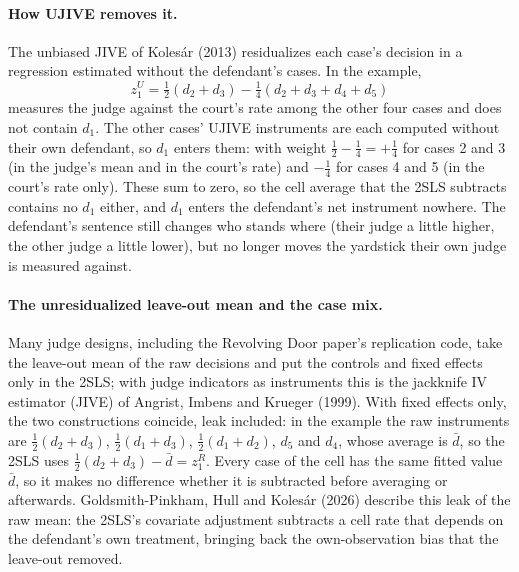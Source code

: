 \documentclass[11pt]{article}
\begin{document}
\paragraph{How UJIVE removes it.} The unbiased JIVE of Kolesár (2013) residualizes each case's decision in a regression estimated without the defendant's cases. In the example,
\begin{equation*}
z^U_1 = \tfrac12(d_2 + d_3) - \tfrac14(d_2 + d_3 + d_4 + d_5)
\end{equation*}
measures the judge against the court's rate among the other four cases and does not contain $d_1$. The other cases' UJIVE instruments are each computed without their own defendant, so $d_1$ enters them: with weight $\tfrac12 - \tfrac14 = +\tfrac14$ for cases 2 and 3 (in the judge's mean and in the court's rate) and $-\tfrac14$ for cases 4 and 5 (in the court's rate only). These sum to zero, so the cell average that the 2SLS subtracts contains no $d_1$ either, and $d_1$ enters the defendant's net instrument nowhere. The defendant's sentence still changes who stands where (their judge a little higher, the other judge a little lower), but no longer moves the yardstick their own judge is measured against.

\paragraph{The unresidualized leave-out mean and the case mix.} Many judge designs, including the Revolving Door paper's replication code, take the leave-out mean of the raw decisions and put the controls and fixed effects only in the 2SLS; with judge indicators as instruments this is the jackknife IV estimator (JIVE) of Angrist, Imbens and Krueger (1999). With fixed effects only, the two constructions coincide, leak included: in the example the raw instruments are $\tfrac12(d_2+d_3)$, $\tfrac12(d_1+d_3)$, $\tfrac12(d_1+d_2)$, $d_5$ and $d_4$, whose average is $\bar d$, so the 2SLS uses $\tfrac12(d_2+d_3) - \bar d = z^R_1$. Every case of the cell has the same fitted value $\bar d$, so it makes no difference whether it is subtracted before averaging or afterwards. Goldsmith-Pinkham, Hull and Kolesár (2026) describe this leak of the raw mean: the 2SLS's covariate adjustment subtracts a cell rate that depends on the defendant's own treatment, bringing back the own-observation bias that the leave-out removed.
\end{document}
